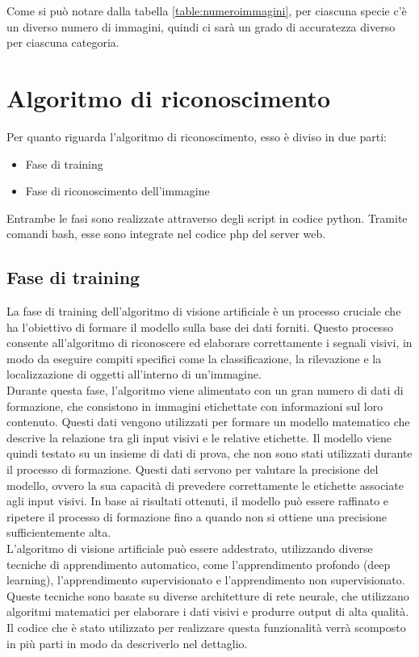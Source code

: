 \documentclass[a4paper,final,12pt]{report}
\begin{document}
Come si può notare dalla tabella \ref{table:numeroimmagini}, per ciascuna specie c'è un diverso numero di immagini, quindi ci sarà un grado di accuratezza diverso per ciascuna categoria.

\section{Algoritmo di riconoscimento}
Per quanto riguarda l'algoritmo di riconoscimento, esso è diviso in due parti:
\begin{itemize}
    \item Fase di training
    \item Fase di riconoscimento dell'immagine
\end{itemize}
Entrambe le fasi sono realizzate attraverso degli script in codice python. Tramite comandi bash, esse sono integrate nel codice php del server web.

\subsection{Fase di training}
La fase di training dell'algoritmo di visione artificiale è un processo cruciale che ha l'obiettivo di formare il modello sulla base dei dati forniti. Questo processo consente all'algoritmo di riconoscere ed elaborare correttamente i segnali visivi, in modo da eseguire compiti specifici come la classificazione, la rilevazione e la localizzazione di oggetti all'interno di un'immagine.\\
Durante questa fase, l'algoritmo viene alimentato con un gran numero di dati di formazione, che consistono in immagini etichettate con informazioni sul loro contenuto. Questi dati vengono utilizzati per formare un modello matematico che descrive la relazione tra gli input visivi e le relative etichette.
Il modello viene quindi testato su un insieme di dati di prova, che non sono stati utilizzati durante il processo di formazione. Questi dati servono per valutare la precisione del modello, ovvero la sua capacità di prevedere correttamente le etichette associate agli input visivi. In base ai risultati ottenuti, il modello può essere raffinato e ripetere il processo di formazione fino a quando non si ottiene una precisione sufficientemente alta.\\
L'algoritmo di visione artificiale può essere addestrato, utilizzando diverse tecniche di apprendimento automatico, come l'apprendimento profondo (deep learning), l'apprendimento supervisionato e l'apprendimento non supervisionato. Queste tecniche sono basate su diverse architetture di rete neurale, che utilizzano algoritmi matematici per elaborare i dati visivi e produrre output di alta qualità.\\
Il codice che è stato utilizzato per realizzare questa funzionalità verrà scomposto in più parti in modo da descriverlo nel dettaglio.
\newpage
\end{document}
